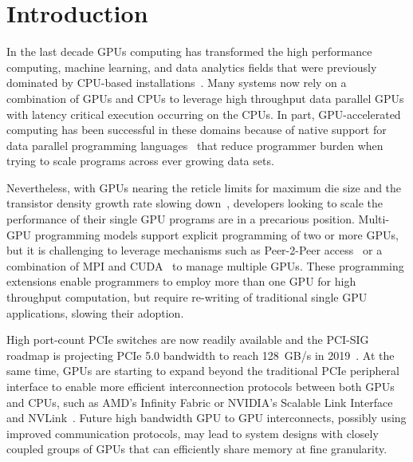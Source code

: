 \section{Introduction}
\label{introduction}

In the last decade GPUs computing has transformed the high performance 
computing, machine learning, and data analytics fields that were previously 
dominated by CPU-based 
installations~\cite{intersect360,cudnn,Lavin15b,SimonyanZ14a}. Many systems now 
rely on a combination of GPUs and CPUs to leverage high throughput data parallel 
GPUs with latency critical execution occurring on the CPUs. In part, 
GPU-accelerated computing has been successful in these domains because of native 
support for data parallel programming languages~\cite{CUDA7,OPENCL} that reduce 
programmer burden when trying to scale programs across ever growing data sets.

Nevertheless, with GPUs nearing the reticle limits for maximum die size and 
the transistor density growth rate slowing down~\cite{mooredead2016}, developers 
looking to scale the performance of their single GPU programs are in a 
precarious position. Multi-GPU programming models support explicit programming 
of two or more GPUs, but it is challenging to leverage mechanisms such as 
Peer-2-Peer access~\cite{NVIDIAP2P} or a combination of MPI and 
CUDA~\cite{NVIDIAMPI} to manage multiple GPUs. These programming extensions 
enable programmers to employ more than one GPU for high throughput computation, 
but require re-writing of traditional single GPU applications,
slowing their adoption.

High port-count PCIe switches are now readily available
and the PCI-SIG roadmap is projecting PCIe 5.0 bandwidth 
to reach \SI{128}{GB/s} in 2019~\cite{PCIeSwitches}. At the same time, GPUs are starting to expand 
beyond the traditional PCIe peripheral interface to enable more efficient interconnection
protocols between both GPUs and CPUs, such as AMD's Infinity Fabric or NVIDIA's Scalable Link Interface
and NVLink~\cite{dgx,SierraHPC,AMDINFINITYFABRIC,NVLINK,NVIDIASLI}.
Future high bandwidth GPU to GPU interconnects, possibly using
improved communication protocols, may lead to system designs with closely coupled
groups of GPUs that can efficiently share memory at fine granularity.

